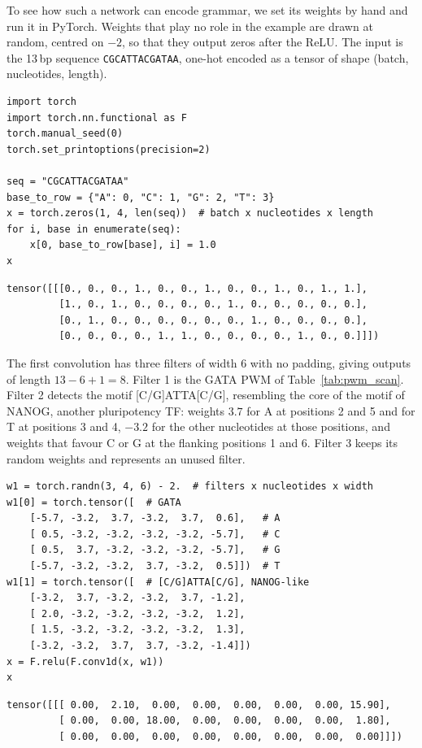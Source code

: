 To see how such a network can encode grammar, we set its weights by hand and run it in PyTorch. Weights that play no role in the example are drawn at random, centred on $-2$, so that they output zeros after the ReLU. The input is the 13\,bp sequence \texttt{CGCATTACGATAA}, one-hot encoded as a tensor of shape (batch, nucleotides, length).
\begin{lstlisting}[style=pycode]
import torch
import torch.nn.functional as F
torch.manual_seed(0)
torch.set_printoptions(precision=2)

seq = "CGCATTACGATAA"
base_to_row = {"A": 0, "C": 1, "G": 2, "T": 3}
x = torch.zeros(1, 4, len(seq))  # batch x nucleotides x length
for i, base in enumerate(seq):
    x[0, base_to_row[base], i] = 1.0
x
\end{lstlisting}
\begin{lstlisting}[style=pyout]
tensor([[[0., 0., 0., 1., 0., 0., 1., 0., 0., 1., 0., 1., 1.],
         [1., 0., 1., 0., 0., 0., 0., 1., 0., 0., 0., 0., 0.],
         [0., 1., 0., 0., 0., 0., 0., 0., 1., 0., 0., 0., 0.],
         [0., 0., 0., 0., 1., 1., 0., 0., 0., 0., 1., 0., 0.]]])
\end{lstlisting}
The first convolution has three filters of width 6 with no padding, giving outputs of length $13-6+1=8$. Filter 1 is the GATA PWM of Table~\ref{tab:pwm_scan}. Filter 2 detects the motif [C/G]ATTA[C/G], resembling the core of the motif of NANOG, another pluripotency TF: weights $3.7$ for A at positions 2 and 5 and for T at positions 3 and 4, $-3.2$ for the other nucleotides at those positions, and weights that favour C or G at the flanking positions 1 and 6. Filter 3 keeps its random weights and represents an unused filter.
\begin{lstlisting}[style=pycode]
w1 = torch.randn(3, 4, 6) - 2.  # filters x nucleotides x width
w1[0] = torch.tensor([  # GATA
    [-5.7, -3.2,  3.7, -3.2,  3.7,  0.6],   # A
    [ 0.5, -3.2, -3.2, -3.2, -3.2, -5.7],   # C
    [ 0.5,  3.7, -3.2, -3.2, -3.2, -5.7],   # G
    [-5.7, -3.2, -3.2,  3.7, -3.2,  0.5]])  # T
w1[1] = torch.tensor([  # [C/G]ATTA[C/G], NANOG-like
    [-3.2,  3.7, -3.2, -3.2,  3.7, -1.2],
    [ 2.0, -3.2, -3.2, -3.2, -3.2,  1.2],
    [ 1.5, -3.2, -3.2, -3.2, -3.2,  1.3],
    [-3.2, -3.2,  3.7,  3.7, -3.2, -1.4]])
x = F.relu(F.conv1d(x, w1))
x
\end{lstlisting}
\begin{lstlisting}[style=pyout]
tensor([[[ 0.00,  2.10,  0.00,  0.00,  0.00,  0.00,  0.00, 15.90],
         [ 0.00,  0.00, 18.00,  0.00,  0.00,  0.00,  0.00,  1.80],
         [ 0.00,  0.00,  0.00,  0.00,  0.00,  0.00,  0.00,  0.00]]])
\end{lstlisting}
